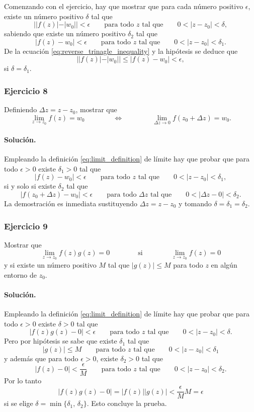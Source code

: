 \documentclass[a4paper]{report}
\begin{document}
Comenzando con el ejercicio, hay que mostrar que para cada número positivo \(\epsilon\), existe un número positivo \(\delta\) tal que
\[
 ||f(z)|-|w_0||<\epsilon\qquad\textrm{para todo }z\textrm{ tal que}\qquad0<|z-z_0|<\delta, 
\]
sabiendo que existe un número positivo \(\delta_2\) tal que
\[
 |f(z)-w_0|<\epsilon\qquad\textrm{para todo }z\textrm{ tal que}\qquad0<|z-z_0|<\delta_1. 
\]
De la ecuación \ref{eq:reverse_trinagle_inequality} y la hipótesis se deduce que  
\[
 ||f(z)|-|w_0||\leq|f(z)-w_0|<\epsilon,
\]
si \(\delta=\delta_1\).

\subsubsection{Ejercicio 8}

Definiendo \(\Delta z=z-z_0\), mostrar que 
\[
 \lim_{z\to z_0}f(z)=w_0
 \qquad\qquad\Leftrightarrow\qquad\qquad
 \lim_{\Delta z\to 0}f(z_0+\Delta z)=w_0.
\]

\paragraph{Solución.} Empleando la definición \ref{eq:limit_definition} de límite hay que probar que para todo \(\epsilon>0\) existe \(\delta_1>0\) tal que
\[
 |f(z)-w_0|<\epsilon\qquad\textrm{para todo }z\textrm{ tal que}\qquad0<|z-z_0|<\delta_1, 
\]
si y solo si existe \(\delta_2\) tal que
\[
 |f(z_0+\Delta z)-w_0|<\epsilon\qquad\textrm{para todo }\Delta z\textrm{ tal que}\qquad0<|\Delta z-0|<\delta_2. 
\]
La demostración es inmediata sustituyendo \(\Delta z=z-z_0\) y tomando \(\delta=\delta_1=\delta_2\). 

\subsubsection{Ejercicio 9} 

Mostrar que 
\[
 \lim_{z\to z_0}f(z)g(z)=0
  \qquad\qquad\textrm{si}\qquad\qquad
 \lim_{z\to z_0}f(z)=0 
\]
y si existe un número positivo \(M\) tal que \(|g(z)|\leq M\) para todo \(z\) en algún entorno de \(z_0\).

\paragraph{Solución.} Empleando la definición \ref{eq:limit_definition} de límite hay que probar que para todo \(\epsilon>0\) existe \(\delta>0\) tal que
\[
 |f(z)g(z)-0|<\epsilon\qquad\textrm{para todo }z\textrm{ tal que}\qquad0<|z-z_0|<\delta. 
\]
Pero por hipótesis se sabe que existe \(\delta_1\) tal que 
\[
 |g(z)|\leq M\qquad\textrm{para todo }z\textrm{ tal que}\qquad0<|z-z_0|<\delta_1
\]
y además que para todo \(\epsilon>0\), existe \(\delta_2>0\) tal que 
\[
 |f(z)-0|<\frac{\epsilon}{M}\qquad\textrm{para todo }z\textrm{ tal que}\qquad0<|z-z_0|<\delta_2. 
\]
Por lo tanto
\[
 |f(z)g(z)-0|=|f(z)||g(z)|<\frac{\epsilon}{M}M=\epsilon
\]
si se elige \(\delta=\min\{\delta_1,\,\delta_2\}\). Esto concluye la prueba.
\end{document}

